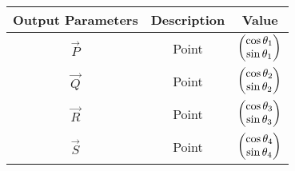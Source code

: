 \begin{tabular}{|c|c|c|}
    \hline
        \textbf{Output Parameters} &\textbf{Description} &\textbf{Value} \\
\hline
          $\vec{P}$ & Point &$\begin{pmatrix}\cos{\theta_1}\\\sin{\theta_1}\end{pmatrix}$ \\

         \hline
          $\vec{Q}$ & Point &$\begin{pmatrix}\cos{\theta_2}\\\sin{\theta_2}\end{pmatrix}$ \\
         \hline
          $\vec{R}$ & Point &$\begin{pmatrix}\cos{\theta_3}\\\sin{\theta_3}\end{pmatrix}$ \\
         \hline
          $\vec{S}$ & Point &$\begin{pmatrix}\cos{\theta_4}\\\sin{\theta_4}\end{pmatrix}$ \\
         \hline
    \end{tabular}

